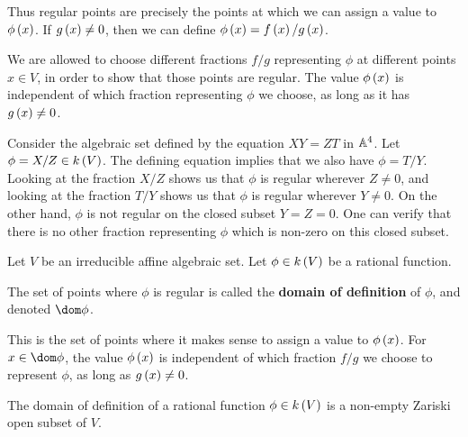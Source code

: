 Thus regular points are precisely the points at which we can assign a value to $ \phi\br{x} $. If $ g\br{x} \ne 0 $, then we can define $ \phi\br{x} = f\br{x} / g\br{x} $.

\begin{note*}
We are allowed to choose different fractions $ f / g $ representing $ \phi $ at different points $ x \in V $, in order to show that those points are regular. The value $ \phi\br{x} $ is independent of which fraction representing $ \phi $ we choose, as long as it has $ g\br{x} \ne 0 $.
\end{note*}

\begin{example*}
Consider the algebraic set defined by the equation $ XY = ZT $ in $ \AA^4 $. Let $ \phi = X / Z \in k\br{V} $. The defining equation implies that we also have $ \phi = T / Y $. Looking at the fraction $ X / Z $ shows us that $ \phi $ is regular wherever $ Z \ne 0 $, and looking at the fraction $ T / Y $ shows us that $ \phi $ is regular wherever $ Y \ne 0 $. On the other hand, $ \phi $ is not regular on the closed subset $ Y = Z = 0 $. One can verify that there is no other fraction representing $ \phi $ which is non-zero on this closed subset.
\end{example*}


Let $ V $ be an irreducible affine algebraic set. Let $ \phi \in k\br{V} $ be a rational function.

\begin{definition*}
The set of points where $ \phi $ is regular is called the \textbf{domain of definition} of $ \phi $, and denoted $ \dom \phi $.
\end{definition*}

This is the set of points where it makes sense to assign a value to $ \phi\br{x} $. For $ x \in \dom \phi $, the value $ \phi\br{x} $ is independent of which fraction $ f / g $ we choose to represent $ \phi $, as long as $ g\br{x} \ne 0 $.

\begin{lemma}
\label{lem:domaindefinition}
The domain of definition of a rational function $ \phi \in k\br{V} $ is a non-empty Zariski open subset of $ V $.
\end{lemma}

